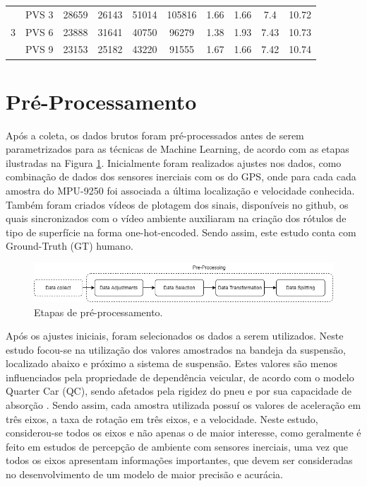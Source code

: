 \begin{table}[h!]
\begin{tabular}{cccccccccc}
\multicolumn{1}{c}{\multirow{4}{*}{3}} & 
PVS 3 & 
28659 & 26143 & 51014 & 105816 & 
1.66 & 1.66 & 7.4 & 10.72 
\\ \cmidrule(l){2-10} 

\multicolumn{1}{c}{} & 
PVS 6 & 
23888 & 31641 & 40750 & 96279 & 
1.38 & 1.93 & 7.43 & 10.73 
\\ \cmidrule(l){2-10} 

\multicolumn{1}{c}{} & 
PVS 9 & 
23153 & 25182 & 43220 & 91555 & 
1.67 & 1.66 & 7.42 & 10.74 
\\ \bottomrule
\end{tabular}
\end{table}

\section{Pré-Processamento}

Após a coleta, os dados brutos foram pré-processados antes de serem parametrizados para as técnicas de Machine Learning, de acordo com as etapas ilustradas na Figura \ref{fig:pre_processing_steps}. Inicialmente foram realizados ajustes nos dados, como combinação de dados dos sensores inerciais com os do GPS, onde para cada cada amostra do MPU-9250 foi associada a última localização e velocidade conhecida. Também foram criados vídeos de plotagem dos sinais, disponíveis no github, os quais sincronizados com o vídeo ambiente auxiliaram na criação dos rótulos de tipo de superfície na forma one-hot-encoded. Sendo assim, este estudo conta com Ground-Truth (GT) humano.

\begin{figure}[h!]
  \centering
  \includegraphics[width=1\textwidth]{figuras/pre-processing.png}
  \caption{Etapas de pré-processamento.}
  \label{fig:pre_processing_steps}
\end{figure}

Após os ajustes iniciais, foram selecionados os dados a serem utilizados. Neste estudo focou-se na utilização dos valores amostrados na bandeja da suspensão, localizado abaixo e próximo a sistema de suspensão. Estes valores são menos influenciados pela propriedade de dependência veicular, de acordo com o modelo Quarter Car (QC), sendo afetados pela rigidez do pneu e por sua capacidade de absorção \cite{Yafeai2019}. Sendo assim, cada amostra utilizada possuí os valores de aceleração em três eixos, a taxa de rotação em três eixos, e a velocidade. Neste estudo, considerou-se todos os eixos e não apenas o de maior interesse, como geralmente é feito em estudos de percepção de ambiente com sensores inerciais, uma vez que todos os eixos apresentam informações importantes, que devem ser consideradas no desenvolvimento de um modelo de maior precisão e acurácia.

